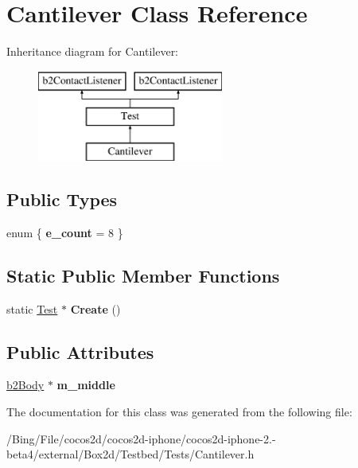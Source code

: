 \hypertarget{class_cantilever}{\section{Cantilever Class Reference}
\label{class_cantilever}
}
Inheritance diagram for Cantilever\-:\begin{figure}[H]
\begin{center}
\leavevmode
\includegraphics[height=3.000000cm]{class_cantilever}
\end{center}
\end{figure}
\subsection*{Public Types}
\begin{DoxyCompactItemize}
\item 
enum \{ {\bfseries e\-\_\-count} =  8
 \}
\end{DoxyCompactItemize}
\subsection*{Static Public Member Functions}
\begin{DoxyCompactItemize}
\item 
\hypertarget{class_cantilever_a154e65503bf2a17a77bff7b796967f0a}{static \hyperlink{class_test}{Test} $\ast$ {\bfseries Create} ()}\label{class_cantilever_a154e65503bf2a17a77bff7b796967f0a}

\end{DoxyCompactItemize}
\subsection*{Public Attributes}
\begin{DoxyCompactItemize}
\item 
\hypertarget{class_cantilever_a4ff2f5409e6c6eb0467580b1cc18fbc6}{\hyperlink{classb2_body}{b2\-Body} $\ast$ {\bfseries m\-\_\-middle}}\label{class_cantilever_a4ff2f5409e6c6eb0467580b1cc18fbc6}

\end{DoxyCompactItemize}


The documentation for this class was generated from the following file\-:\begin{DoxyCompactItemize}
\item 
/\-Bing/\-File/cocos2d/cocos2d-\/iphone/cocos2d-\/iphone-\/2.-\/beta4/external/\-Box2d/\-Testbed/\-Tests/Cantilever.\-h\end{DoxyCompactItemize}
